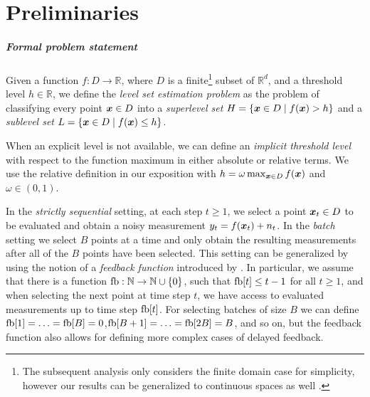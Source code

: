 \chapter{Preliminaries} \label{ch:prelim}

\paragraph{Formal problem statement}
Given a function ${f : D \to \mathbb{R}}$, where $D$ is a
finite\footnote{The subsequent analysis only considers the finite domain case
for simplicity, however our results can be generalized to continuous spaces
as well \citep[cf.][]{srinivas10}.}
subset of $\mathbb{R}^d$, and a threshold level ${h \in \mathbb{R}}$,
we define the \emph{level set estimation problem} as the problem of classifying
every point $\bm{x} \in D$ into a \emph{superlevel set}
${H = \{\bm{x} \in D \mid f(\bm{x}) > h\}}$ and a \emph{sublevel set}
${L = \{\bm{x} \in D \mid f(\bm{x}) \leq h\}}$.

When an explicit level is not available, we can define an
\emph{implicit threshold level}
with respect to the function maximum in either absolute or relative terms.
We use the relative definition in our exposition with
${h = \omega \max_{\bm{x}\in D} f(\bm{x})}$
and $\omega \in (0, 1)$.

In the \emph{strictly sequential} setting,
at each step $t \geq 1$, we select a point $\bm{x}_t \in D$ to be evaluated and
obtain a noisy measurement $y_t = f(\bm{x}_t) + n_t$.
In the \emph{batch} setting we select $B$ points at a time and only obtain
the resulting measurements after all of the $B$ points have been selected.
This setting can be generalized by using the notion of a
\emph{feedback function} introduced by \citet{desautels12}.
In particular, we assume that there is a function
${\mathop{\mathrm{fb}} : \mathbb{N} \to \mathbb{N}\cup\{0\}}$, such that
$\mathop{\mathrm{fb}}[t] \leq t-1$ for all $t \geq 1$, and when selecting the next point
at time step $t$, we have access to evaluated measurements up to
time step $\mathop{\mathrm{fb}}[t]$. For selecting batches of size $B$ we can define
$\mathop{\mathrm{fb}}[1] = \ldots = \mathop{\mathrm{fb}}[B] = 0$,\enskip$\mathop{\mathrm{fb}}[B+1] = \ldots = \mathop{\mathrm{fb}}[2B] = B$,
and so on,
but the feedback function also allows for defining more complex cases
of delayed feedback.

